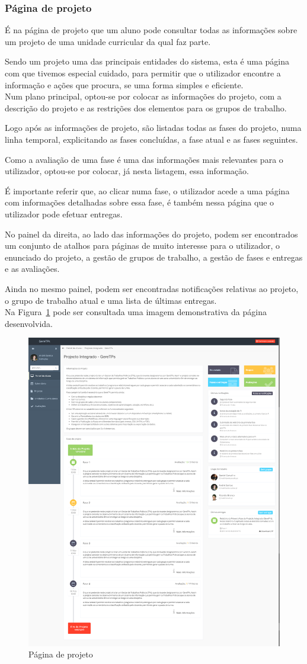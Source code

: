 \subsubsection{Página de projeto}

É na página de projeto que um aluno pode consultar todas as informações sobre um projeto de uma unidade curricular da qual faz parte.

Sendo um projeto uma das principais entidades do sistema, esta é uma página com que tivemos especial cuidado, para permitir que o utilizador encontre a informação e ações que procura, se uma forma simples e eficiente.\\

Num plano principal, optou-se por colocar as informações do projeto, com a descrição do projeto e as restrições dos elementos para os grupos de trabalho.

Logo após as informações de projeto, são listadas todas as fases do projeto, numa  linha temporal, explicitando as fases concluídas, a fase atual e as fases seguintes.

Como a avaliação de uma fase é uma das informações mais relevantes para o utilizador, optou-se por colocar, já nesta listagem, essa informação.

É importante referir que, ao clicar numa fase, o utilizador acede a uma página com informações detalhadas sobre essa fase, é também nessa página que o utilizador pode efetuar entregas.

No painel da direita, ao lado das informações do projeto, podem ser encontrados um conjunto de atalhos para páginas de muito interesse para o utilizador, o enunciado do projeto, a gestão de grupos de trabalho, a gestão de fases e entregas e as avaliações.

Ainda no mesmo painel, podem ser encontradas notificações relativas ao projeto, o grupo de trabalho atual e uma lista de últimas entregas.\\

Na Figura~\ref{fig:student_project} pode ser consultada uma imagem demonstrativa da página desenvolvida.

\begin{figure}[H]
  \centering
  \includegraphics[width=.8\textwidth,center]{images/implementacao/alunos/project}
  \caption{Página de projeto}
  \label{fig:student_project}
\end{figure}
